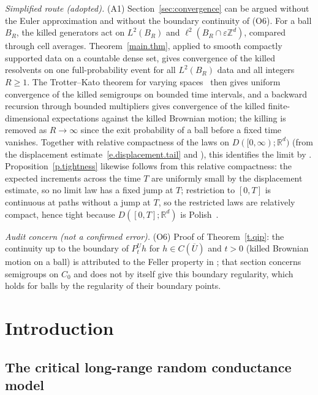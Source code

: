 \documentclass[11pt]{amsart}
\theoremstyle{plain}
\theoremstyle{definition}
\theoremstyle{remark}
\newcommand{\Zd}{\mathbb{Z}^d}
\newcommand{\Rd}{\mathbb{R}^d}
\newcommand{\eps}{\varepsilon}
\begin{document}
\noindent\emph{Simplified route (adopted).} (A1) Section~\ref{sec:convergence} can be argued
without the Euler approximation and without the boundary continuity of (O6). For a ball $B_R$, the
killed generators act on $L^2(B_R)$ and $\ell^2(B_R \cap \eps\Zd)$, compared through cell averages.
Theorem~\ref{main.thm}, applied to smooth compactly supported data on a countable dense set, gives
convergence of the killed resolvents on one full-probability event for all $L^2(B_R)$ data and all
integers $R \ge 1$. The Trotter--Kato theorem for varying spaces~\cite[Theorem~1.6.1]{EthierKurtz1986}
then gives uniform convergence of the killed semigroups on bounded time intervals, and a backward
recursion through bounded multipliers gives convergence of the killed finite-dimensional expectations
against the killed Brownian motion; the killing is removed as $R \to \infty$ since the exit probability of
a ball before a fixed time vanishes. Together with relative compactness
of the laws on $D([0,\infty);\Rd)$ (from the displacement estimate~\eqref{e.displacement.tail} and
\cite[Chapter~3, Theorem~8.6]{EthierKurtz1986}), this identifies the limit by
\cite[Chapter~3, Theorem~7.8]{EthierKurtz1986}. Proposition~\ref{p.tightness} likewise follows from this
relative compactness: the expected increments across the time $T$ are uniformly small by the
displacement estimate, so no limit law has a fixed jump at $T$; restriction to $[0,T]$ is continuous at
paths without a jump at $T$, so the restricted laws are relatively compact, hence tight because $D([0,T];\Rd)$
is Polish~\cite[Theorems~12.1 and 12.2]{Billingsley1999}.

\noindent\emph{Audit concern (not a confirmed error).} (O6) Proof of Theorem~\ref{t.qip}: the
continuity up to the boundary of $P^U_t h$ for $h \in C(\overline U)$ and $t > 0$ (killed Brownian
motion on a ball) is attributed to the Feller property in \cite[Section~4.2]{EthierKurtz1986}; that
section concerns semigroups on $C_0$ and does not by itself give this boundary regularity, which holds
for balls by the regularity of their boundary points.

	
	\section{Introduction}
	
	\subsection{The critical long-range random conductance model}
	
\end{document}
